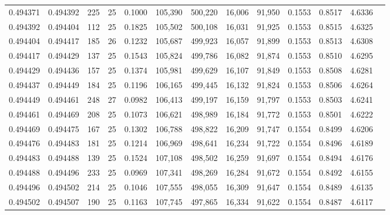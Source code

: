 \begin{tabular}{rrrrrrrrrrrrr}
0.494371 & 0.494392 & 225 &  25 &                                     0.1000 & 105,390 & 500,220 &  16,006 &  91,950 & 0.1553 & 0.8517 & 4.6336 \\
0.494392 & 0.494404 & 112 &  25 &                                     0.1825 & 105,502 & 500,108 &  16,031 &  91,925 & 0.1553 & 0.8515 & 4.6325 \\
0.494404 & 0.494417 & 185 &  26 &                                     0.1232 & 105,687 & 499,923 &  16,057 &  91,899 & 0.1553 & 0.8513 & 4.6308 \\
0.494417 & 0.494429 & 137 &  25 &                                     0.1543 & 105,824 & 499,786 &  16,082 &  91,874 & 0.1553 & 0.8510 & 4.6295 \\
0.494429 & 0.494436 & 157 &  25 &                                     0.1374 & 105,981 & 499,629 &  16,107 &  91,849 & 0.1553 & 0.8508 & 4.6281 \\
0.494437 & 0.494449 & 184 &  25 &                                     0.1196 & 106,165 & 499,445 &  16,132 &  91,824 & 0.1553 & 0.8506 & 4.6264 \\
0.494449 & 0.494461 & 248 &  27 &                                     0.0982 & 106,413 & 499,197 &  16,159 &  91,797 & 0.1553 & 0.8503 & 4.6241 \\
0.494461 & 0.494469 & 208 &  25 &                                     0.1073 & 106,621 & 498,989 &  16,184 &  91,772 & 0.1553 & 0.8501 & 4.6222 \\
0.494469 & 0.494475 & 167 &  25 &                                     0.1302 & 106,788 & 498,822 &  16,209 &  91,747 & 0.1554 & 0.8499 & 4.6206 \\
0.494476 & 0.494483 & 181 &  25 &                                     0.1214 & 106,969 & 498,641 &  16,234 &  91,722 & 0.1554 & 0.8496 & 4.6189 \\
0.494483 & 0.494488 & 139 &  25 &                                     0.1524 & 107,108 & 498,502 &  16,259 &  91,697 & 0.1554 & 0.8494 & 4.6176 \\
0.494488 & 0.494496 & 233 &  25 &                                     0.0969 & 107,341 & 498,269 &  16,284 &  91,672 & 0.1554 & 0.8492 & 4.6155 \\
0.494496 & 0.494502 & 214 &  25 &                                     0.1046 & 107,555 & 498,055 &  16,309 &  91,647 & 0.1554 & 0.8489 & 4.6135 \\
0.494502 & 0.494507 & 190 &  25 &                                     0.1163 & 107,745 & 497,865 &  16,334 &  91,622 & 0.1554 & 0.8487 & 4.6117 \\

\end{tabular}
